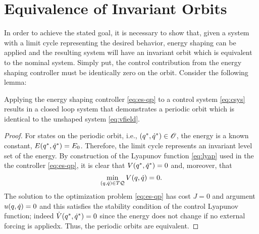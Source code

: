 \documentclass[twocolumn]{article}
\begin{document}
\section{Equivalence of Invariant Orbits}
In order to achieve the stated goal, it is necessary to show that, given a system with a limit cycle representing the desired behavior, energy shaping can be applied and the resulting system will have an invariant orbit which is equivalent to the nominal system. Simply put, the control contribution from the energy shaping controller must be identically zero on the orbit. Consider the following lemma:

\begin{lemma}
  Applying the energy shaping controller \eqref{eq:es-qp} to a control system \eqref{eq:csys} results in a closed loop system that demonstrates a periodic orbit which is identical to the unshaped system \eqref{eq:vfield}.
\end{lemma}

\begin{proof}
  For states on the periodic orbit, i.e., $(q^{*}, \dot{q}^{*}) \in \mathscr{O}$, the energy is a known constant, $E(q^{*}, \dot{q}^{*}) = E_{0}$.
  Therefore, the limit cycle represents an invariant level set of the energy.
  By construction of the Lyapunov function \eqref{eq:lyap} used in the the controller \eqref{eq:es-qp}, it is clear that $V(q^{*}, \dot{q}^{*}) = 0$ and, moreover, that $$\min_{(q, \dot{q}) \in T\mathcal{Q}} V(q, \dot{q}) = 0.$$
  The solution to the optimization problem \eqref{eq:es-qp} has cost $J = 0$ and argument $u(q, \dot{q}) = 0$ and this satisfies the stability condition of the control Lyapunov function; indeed ${\dot V}(q^{*}, \dot{q}^{*}) = 0$ since the energy does not change if no external forcing is appliedx.
  Thus, the periodic orbits are equivalent.
\end{proof}
\end{document}
